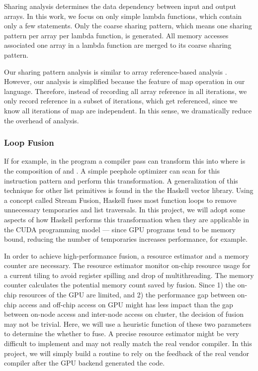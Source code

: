 

Sharing analysis determines the data dependency between input and output arrays.
In this work, we focus on only simple lambda functions, which contain only a few statements.
Only the coarse sharing pattern, which means one sharing pattern per array per lambda function, is generated.
All memory accesses associated one array in a lambda function are merged to its coarse sharing pattern.

Our sharing pattern analysis is similar to array reference-based analysis \cite{alg_reference}.
However, our analysis is simplified because the feature of map operation in our language.
Therefore, instead of recording all array reference in all iterations, we only record reference in a subset of iterations, which get referenced, 
since we know all iterations of map are independent. 
In this sense, we dramatically reduce the overhead of analysis.


\subsubsection{Loop Fusion}\label{loop-fusion}

If for example, in the program
 a compiler pass can transform this
into  where  is the composition of
 and . A simple peephole optimizer can scan for this
instruction pattern and perform this transformation. A generalization of
this technique for other list primitives is found in the the Haskell
vector library. Using a concept called Stream Fusion\cite{StreamFusion}, Haskell
fuses most function loops to remove unnecessary temporaries and list
traversals. In this project, we will adopt some aspects of how Haskell
performs this transformation when they are applicable in the CUDA
programming model --- since GPU programs tend to be memory bound,
reducing the number of temporaries increases performance, for example.

In order to achieve high-performance fusion, a resource estimator and a
memory counter are necessary. The resource estimator monitor on-chip
resource usage for a current tiling to avoid register spilling and drop
of multithreading. The memory counter calculates the potential
memory count saved by fusion. Since 1) the on-chip resources of the GPU are
limited, and 2) the performance gap between on-chip access and off-chip
access on GPU might has less impact than the gap between on-node access
and inter-node access on cluster, the decision of fusion may not be
trivial. Here, we will use a heuristic function of these two parameters to
determine the whether to fuse. A precise resource estimator might be
very difficult to implement and may not really match the real vendor
compiler. In this project, we will simply build a routine to rely on the
feedback of the real vendor compiler after the GPU backend generated the
code.

